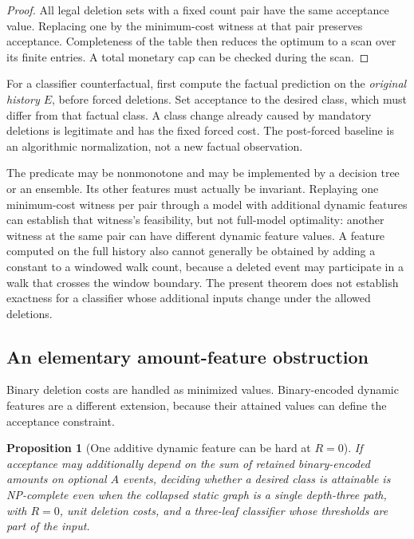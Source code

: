 \documentclass[11pt]{article}
\newtheorem{proposition}[theorem]{Proposition}
\theoremstyle{remark}
\begin{document}
\begin{proof}
All legal deletion sets with a fixed count pair have the same acceptance
value. Replacing one by the minimum-cost witness at that pair preserves
acceptance. Completeness of the table then reduces the optimum to a scan
over its finite entries. A total monetary cap can be checked during the scan.
\end{proof}

For a classifier counterfactual, first compute the factual prediction on the
\emph{original history $E$}, before forced deletions. Set acceptance to the
desired class, which must differ from that factual class. A class change
already caused by mandatory deletions is legitimate and has the fixed forced
cost. The post-forced baseline is an algorithmic normalization, not a new
factual observation.

The predicate may be nonmonotone and may be implemented by a decision tree or
an ensemble. Its other features must actually be invariant. Replaying one
minimum-cost witness per pair through a model with additional dynamic features
can establish that witness's feasibility, but not full-model optimality:
another witness at the same pair can have different dynamic feature values.
A feature computed on the full history also cannot generally be obtained
by adding a constant to a windowed walk count, because a deleted event may
participate in a walk that crosses the window boundary. The present theorem
does not establish exactness for a classifier whose additional inputs change
under the allowed deletions.

\subsection{An elementary amount-feature obstruction}

Binary deletion costs are handled as minimized values. Binary-encoded dynamic
features are a different extension, because their attained values can define
the acceptance constraint.

\begin{proposition}[One additive dynamic feature can be hard at $R=0$]
\label{prop:amount}
If acceptance may additionally depend on the sum of retained binary-encoded
amounts on optional $A$ events, deciding whether a desired class is attainable
is NP-complete even when the collapsed static graph is a single depth-three
path, with $R=0$, unit deletion
costs, and a three-leaf classifier whose thresholds are part of the input.
\end{proposition}
\end{document}
